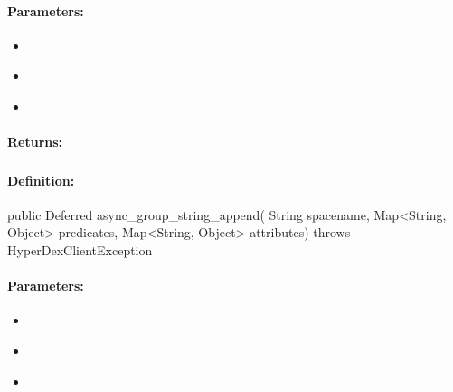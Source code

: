 \paragraph{Parameters:}
\begin{itemize}[noitemsep]
\item {}\\

\item {}\\

\item {}\\

\end{itemize}

\paragraph{Returns:}


\pagebreak
\subsubsection{}
\label{api:java:async_group_string_append}


\paragraph{Definition:}
\begin{javacode}
public Deferred async_group_string_append(
        String spacename,
        Map<String, Object> predicates,
        Map<String, Object> attributes) throws HyperDexClientException
\end{javacode}

\paragraph{Parameters:}
\begin{itemize}[noitemsep]
\item {}\\

\item {}\\

\item {}\\

\end{itemize}

